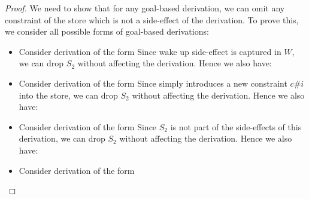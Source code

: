\documentclass{tlp}
\begin{document}
\begin{proof}
  We need to show that for any goal-based derivation, we can omit any constraint
  of the store which is not a side-effect of the derivation. To prove this, we
  consider all possible forms of goal-based derivations:
  
  \begin{itemize}
	  \item {} Consider derivation of the form
	           
	        \eda
	        Since wake up side-effect is captured in $W$, we can drop $S_2$ without affecting the derivation.
	        Hence we also have:
	           
	        \eda
	  \item {} Consider derivation of the form
	          \goaltranssf{\{\} \backslash \{\}} 
	        \eda
	        Since  simply introduces a new constraint $c\#i$ into the store, we
	        can drop $S_2$ without affecting the derivation. Hence we also have:
	          \goaltranssf{\{\} \backslash \{\}} 
	        \eda
	  \item {} Consider derivation of the form
	        \eda
	        Since $S_2$ is not part of the side-effects of this derivation, we can drop $S_2$ 
	        without affecting the derivation. Hence we also have:
	        \eda
	  \item {} Consider derivation of the form

\end{itemize}
\end{proof}
\end{document}
